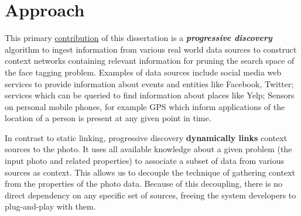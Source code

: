 \section{Approach}
This primary \uline{contribution} of this dissertation is a \textbf{\textit{progressive discovery}} algorithm to ingest information from various real world data sources to construct context networks containing relevant information for pruning the search space of the face tagging problem. Examples of data sources include social media web services to provide information about events and entities like Facebook, Twitter; services which can be queried to find information about places like Yelp; Sensors on personal mobile phones, for example GPS which inform applications of the location of a person is present at any given point in time.

In contrast to static linking, progressive discovery \textbf{dynamically links} context sources to the photo. It uses all available knowledge about a given problem (the input photo and related properties) to associate a subset of data from various sources as context. This allows us to decouple the technique of gathering context from the properties of the photo data. Because of this decoupling, there is no direct dependency on any specific set of sources, freeing the system developers to plug-and-play with them.




